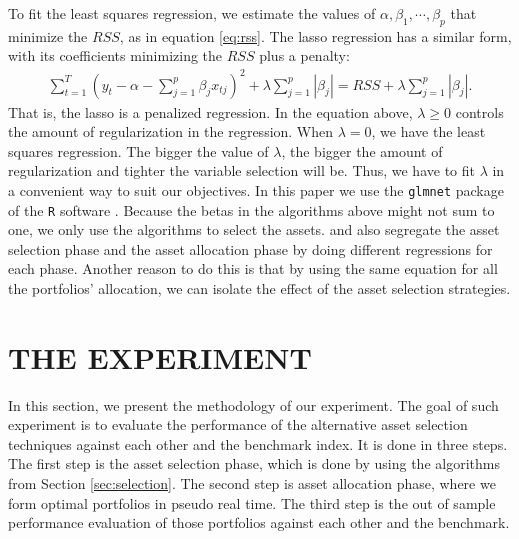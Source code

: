 \documentclass[12pt,oneside,a4paper]{memoir}
\begin{document}
To fit the least squares regression, we estimate the values of $\alpha, \beta_1, \cdots, \beta_p$ that minimize the $RSS$, as in equation \eqref{eq:rss}.
The lasso regression has a similar form, with its coefficients minimizing the $RSS$ plus a penalty: 
\begin{align} \label{lasso-reg} %
\sum_{t=1}^{T} 
\left( y_t - \alpha - \sum_{j=1}^{p} \beta_j x_{tj} \right)^2 +
\lambda \sum_{j=1}^{p} |\beta_{j}| =
	RSS + 
	\lambda \sum_{j=1}^{p} |\beta_{j}| .
\end{align}
That is, the lasso is a penalized regression.
In the equation above, $\lambda \geq 0$ controls the amount of regularization in the regression.
When $\lambda = 0$, we have the least squares regression.
The bigger the value of $\lambda$, the bigger the amount of regularization and tighter the variable selection will be.
Thus, we have to fit $\lambda$ in a convenient way to suit our objectives.
In this paper we use the \texttt{glmnet} package \cite{R:glmnet} of the \texttt{R} software \cite{R}.
Because the betas in the algorithms above might not sum to one, we only use the algorithms to select the assets.
 and  also segregate the asset selection phase and the asset allocation phase by doing different regressions for each phase.
Another reason to do this is that by using the same equation for all the portfolios' allocation, we can isolate the effect of the asset selection strategies.

\section{THE EXPERIMENT} \label{sec:experiment}

In this section, we present the methodology of our experiment.
The goal of such experiment is to evaluate the performance of the alternative asset selection techniques against each other and the benchmark index.
It is done in three steps.
The first step is the asset selection phase, which is done by using the algorithms from Section \ref{sec:selection}.
The second step is asset allocation phase, where we form optimal portfolios in pseudo real time.
The third step is the out of sample performance evaluation of those portfolios against each other and the benchmark.
\end{document}

